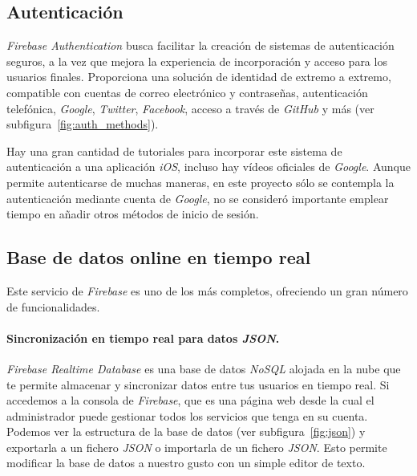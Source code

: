 \subsection{Autenticación}
\textit{Firebase Authentication} \cite{google_firebase_nodate-1} busca facilitar la creación de sistemas de autenticación seguros, a la vez que mejora la experiencia de incorporación y acceso para los usuarios finales. Proporciona una solución de identidad de extremo a extremo, compatible con cuentas de correo electrónico y contraseñas, autenticación telefónica, \textit{Google}, \textit{Twitter}, \textit{Facebook}, acceso a través de \textit{GitHub} y más (ver subfigura~\ref{fig:auth_methods}).

Hay una gran cantidad de tutoriales \cite{firebase_tutorial_2016} para incorporar este sistema de autenticación a una aplicación \textit{iOS}, incluso hay vídeos oficiales de \textit{Google}. Aunque permite autenticarse de muchas maneras, en este proyecto sólo se contempla la autenticación mediante cuenta de \textit{Google}, no se consideró importante emplear tiempo en añadir otros métodos de inicio de sesión.

\subsection{Base de datos online en tiempo real}
Este servicio de \textit{Firebase} \cite{google_firebase_nodate-2} es uno de los más completos, ofreciendo un gran número de funcionalidades.
\paragraph{Sincronización en tiempo real para datos \textit{JSON}.} \textit{Firebase Realtime Database} es una base de datos \textit{NoSQL} alojada en la nube que te permite almacenar y sincronizar datos entre tus usuarios en tiempo real. Si accedemos a la consola de \textit{Firebase}, que es una página web desde la cual el administrador puede gestionar todos los servicios que tenga en su cuenta. Podemos ver la estructura de la base de datos (ver subfigura~\ref{fig:json}) y exportarla a un fichero \textit{JSON} o importarla de un fichero \textit{JSON}. Esto permite modificar la base de datos a nuestro gusto con un simple editor de texto.


